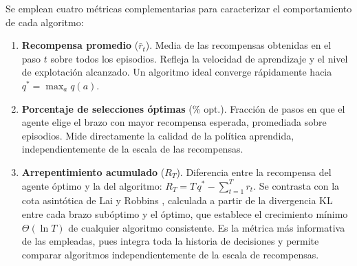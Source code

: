 Se emplean cuatro métricas complementarias para caracterizar el comportamiento de cada algoritmo:

\begin{enumerate}

    \item \textbf{Recompensa promedio} ($\bar{r}_t$). Media de las recompensas obtenidas en el paso $t$ sobre todos los episodios. Refleja la velocidad de aprendizaje y el nivel de explotación alcanzado. Un algoritmo ideal converge rápidamente hacia $q^* = \max_a q(a)$.

    \item \textbf{Porcentaje de selecciones óptimas} (\% opt.). Fracción de pasos en que el agente elige el brazo con mayor recompensa esperada, promediada sobre episodios. Mide directamente la calidad de la política aprendida, independientemente de la escala de las recompensas.

    \item \textbf{Arrepentimiento acumulado} ($R_T$). Diferencia entre la recompensa del agente óptimo y la del algoritmo: $R_T = T\,q^* - \sum_{t=1}^{T} r_t$. Se contrasta con la cota asintótica de Lai y Robbins \cite{lai1985}, calculada a partir de la divergencia KL entre cada brazo subóptimo y el óptimo, que establece el crecimiento mínimo $\Theta(\ln T)$ de cualquier algoritmo consistente. Es la métrica más informativa de las empleadas, pues integra toda la historia de decisiones y permite comparar algoritmos independientemente de la escala de recompensas.



\end{enumerate}
